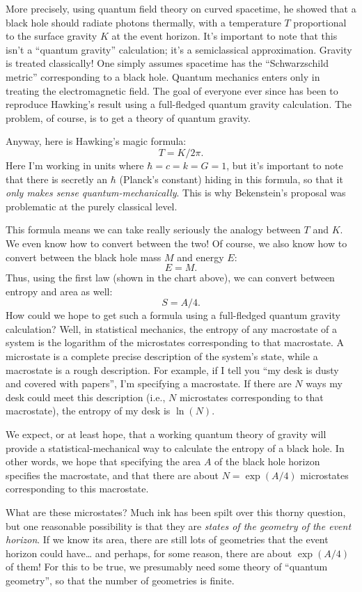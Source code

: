 \documentclass{article}
\begin{document}
More precisely, using quantum field theory on curved spacetime, he
showed that a black hole should radiate photons thermally, with a
temperature \(T\) proportional to the surface gravity \(K\) at the event
horizon. It's important to note that this isn't a ``quantum gravity''
calculation; it's a semiclassical approximation. Gravity is treated
classically! One simply assumes spacetime has the ``Schwarzschild
metric'' corresponding to a black hole. Quantum mechanics enters only in
treating the electromagnetic field. The goal of everyone ever since has
been to reproduce Hawking's result using a full-fledged quantum gravity
calculation. The problem, of course, is to get a theory of quantum
gravity.

Anyway, here is Hawking's magic formula: \[T = K / 2\pi.\] Here I'm
working in units where \(\hbar = c = k = G = 1\), but it's important to
note that there is secretly an \(\hbar\) (Planck's constant) hiding in
this formula, so that it \emph{only makes sense quantum-mechanically}.
This is why Bekenstein's proposal was problematic at the purely
classical level.

This formula means we can take really seriously the analogy between
\(T\) and \(K\). We even know how to convert between the two! Of course,
we also know how to convert between the black hole mass \(M\) and energy
\(E\): \[E = M.\] Thus, using the first law (shown in the chart above),
we can convert between entropy and area as well: \[S = A/4.\] How could
we hope to get such a formula using a full-fledged quantum gravity
calculation? Well, in statistical mechanics, the entropy of any
macrostate of a system is the logarithm of the microstates corresponding
to that macrostate. A microstate is a complete precise description of
the system's state, while a macrostate is a rough description. For
example, if I tell you ``my desk is dusty and covered with papers'', I'm
specifying a macrostate. If there are \(N\) ways my desk could meet this
description (i.e., \(N\) microstates corresponding to that macrostate),
the entropy of my desk is \(\ln(N)\).

We expect, or at least hope, that a working quantum theory of gravity
will provide a statistical-mechanical way to calculate the entropy of a
black hole. In other words, we hope that specifying the area \(A\) of
the black hole horizon specifies the macrostate, and that there are
about \(N = \exp(A/4)\) microstates corresponding to this macrostate.

What are these microstates? Much ink has been spilt over this thorny
question, but one reasonable possibility is that they are \emph{states
of the geometry of the event horizon}. If we know its area, there are
still lots of geometries that the event horizon could have\ldots{} and
perhaps, for some reason, there are about \(\exp(A/4)\) of them! For
this to be true, we presumably need some theory of ``quantum geometry'',
so that the number of geometries is finite.
\end{document}
